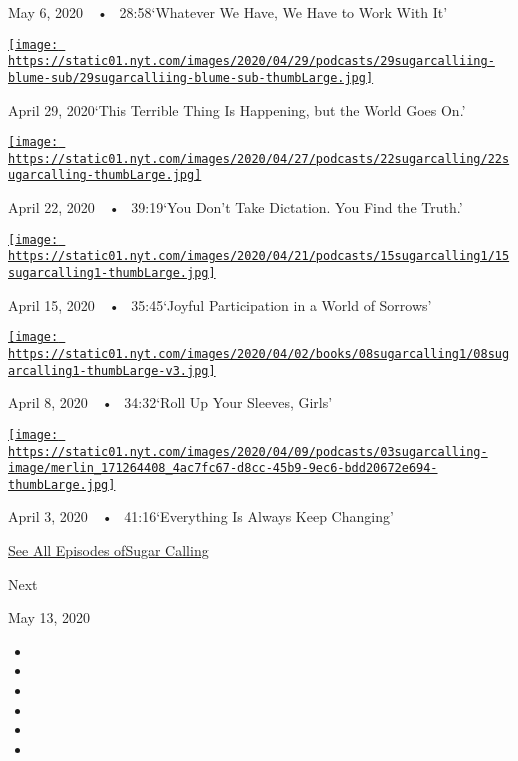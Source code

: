 May 6, 2020~~•~ 28:58`Whatever We Have, We Have to Work With It'

\href{https://www.nytimes.com/2020/04/29/podcasts/sugar-calling-judy-blume-quarantine-virus.html?action=click\&module=audio-series-bar\&region=header\&pgtype=Article}{\texttt{[image: https://static01.nyt.com/images/2020/04/29/podcasts/29sugarcalliing-blume-sub/29sugarcalliing-blume-sub-thumbLarge.jpg]}}

April 29, 2020`This Terrible Thing Is Happening, but the World Goes On.'

\href{https://www.nytimes.com/2020/04/22/podcasts/sugar-calling-amy-tan-quarantine-virus.html?action=click\&module=audio-series-bar\&region=header\&pgtype=Article}{\texttt{[image: https://static01.nyt.com/images/2020/04/27/podcasts/22sugarcalling/22sugarcalling-thumbLarge.jpg]}}

April 22, 2020~~•~ 39:19`You Don't Take Dictation. You Find the Truth.'

\href{https://www.nytimes.com/2020/04/15/podcasts/sugar-calling-pico-iyer-coronavirus.html?action=click\&module=audio-series-bar\&region=header\&pgtype=Article}{\texttt{[image: https://static01.nyt.com/images/2020/04/21/podcasts/15sugarcalling1/15sugarcalling1-thumbLarge.jpg]}}

April 15, 2020~~•~ 35:45`Joyful Participation in a World of Sorrows'

\href{https://www.nytimes.com/2020/04/08/podcasts/sugar-calling-margaret-atwood-coronavirus.html?action=click\&module=audio-series-bar\&region=header\&pgtype=Article}{\texttt{[image: https://static01.nyt.com/images/2020/04/02/books/08sugarcalling1/08sugarcalling1-thumbLarge-v3.jpg]}}

April 8, 2020~~•~ 34:32`Roll Up Your Sleeves, Girls'

\href{https://www.nytimes.com/2020/04/03/podcasts/sugar-calling-george-saunders-coronavirus.html?action=click\&module=audio-series-bar\&region=header\&pgtype=Article}{\texttt{[image: https://static01.nyt.com/images/2020/04/09/podcasts/03sugarcalling-image/merlin\_171264408\_4ac7fc67-d8cc-45b9-9ec6-bdd20672e694-thumbLarge.jpg]}}

April 3, 2020~~•~ 41:16`Everything Is Always Keep Changing'

\href{https://www.nytimes.com/column/sugar-calling}{See All Episodes
ofSugar Calling}

Next

May 13, 2020

\begin{itemize}
\item
\item
\item
\item
\item
\item
\end{itemize}

